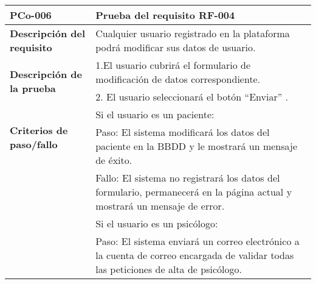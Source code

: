 \begin{table}[htpb]
\centering
\begin{tabularx}{\textwidth}{|l|X|}
\hline
\textbf{PCo-006}                                     & \textbf{Prueba del requisito RF-004}                                                                                                                                                                                                                                                                                                     \\ \hline
\textbf{Descripción del requisito}                 & Cualquier usuario registrado en la plataforma podrá modificar sus datos de usuario.                                                                                                                                                                                                                                                      \\ \hline
\multirow{2}{*}{\textbf{Descripción de la prueba}} & 1.El usuario cubrirá el formulario de modificación de datos correspondiente.                                                                                                                                                                                                                                                             \\ \cline{2-2} 
                                                   & 2. El usuario seleccionará el botón ``Enviar'' .                                                                                                                                                                                                                                                                                            \\ \hline
\multirow{2}{*}{\textbf{Criterios de paso/fallo}}  & Si el usuario es un paciente: \\
& Paso: El sistema modificará los datos del paciente en la BBDD y le mostrará un mensaje de éxito.\\
& Fallo: El sistema no registrará los datos del formulario, permanecerá en la página actual y mostrará un mensaje de error.\\ \cline{2-2} 
                                                   & Si el usuario es un psicólogo: \\
                                                   & Paso: El sistema enviará un correo electrónico a la cuenta de correo encargada de validar todas las peticiones de alta de psicólogo.\\ 

\end{tabularx}
\end{table}
